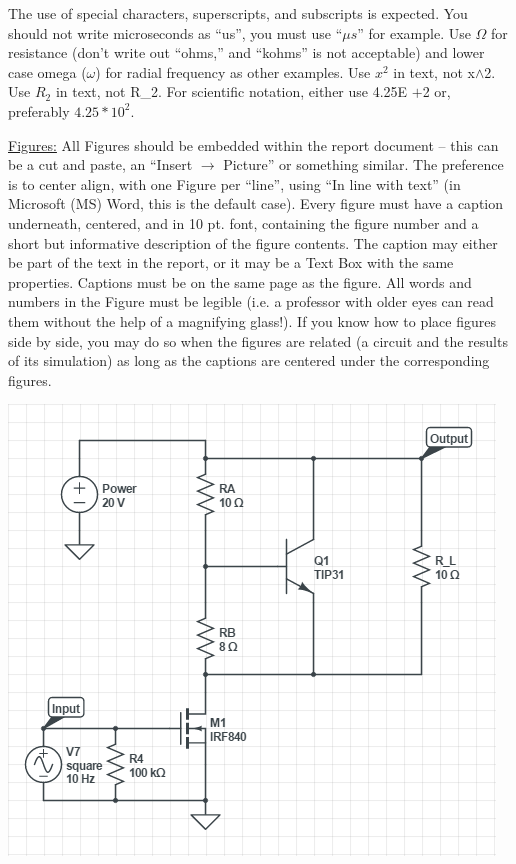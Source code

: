 \documentclass[11pt]{ECEtemp}
\begin{document}
The use of special characters, superscripts, and subscripts is expected.  You should not write microseconds as “us”, you must use “$\mu s$” for example.  
Use $\Omega$ for resistance (don’t write out “ohms,” and “kohms” is not acceptable) and lower case omega ($\omega$) for radial frequency as other examples.  Use $x^2$ in text, not x$\wedge$2.  
Use $R_2$ in text, not R\_2.  For scientific notation, either use 4.25E $+$2 or, preferably $4.25*10^2$.  

\underline{Figures:} All Figures should be embedded within the report document – this can be a cut and paste, an “Insert $\rightarrow$ Picture” or something similar. The preference is to center align, with one Figure per “line”, using “In line with text” (in Microsoft (MS) Word, this is the default case).  Every figure must have a caption underneath, centered, and in 10 pt. font, containing the figure number and a short but informative description of the figure contents. The caption may either be part of the text in the report, or it may be a Text Box with the same properties. Captions must be on the same page as the figure.  All words and numbers in the Figure must be legible (i.e. a professor with older eyes can read them without the help of a magnifying glass!).
If you know how to place figures side by side, you may do so when the figures are related (a circuit and the results of its simulation) as long as the captions are centered under the corresponding figures. 

\begin{center}
\includegraphics[scale=1]{img/figure_1}
\label{fig_figure_1}
\end{center}

\newpage

\begin{center}

\end{center}





\end{document}
